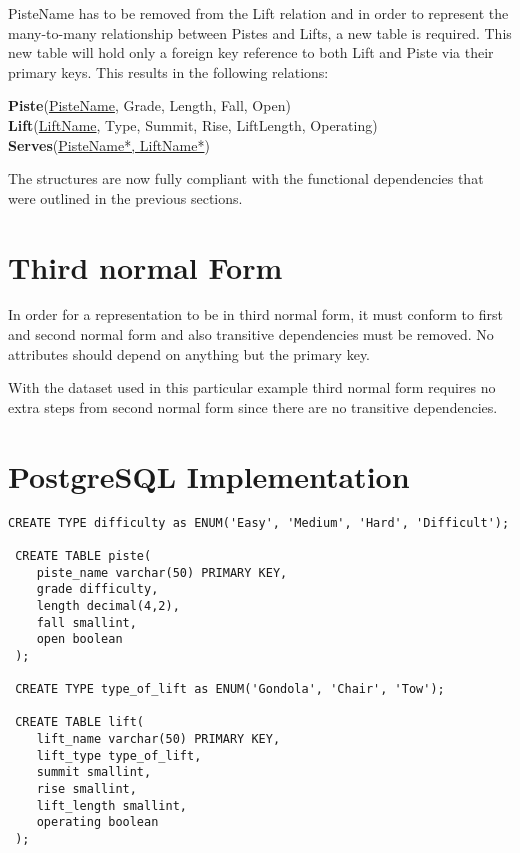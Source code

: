 \documentclass[titlepage ,12pt]{article}
\begin{document}
PisteName has to be removed from the Lift relation and in order to represent the many-to-many relationship between Pistes and Lifts, a new table is required. This new table will hold only a foreign key reference to both Lift and Piste via their primary keys. This results in the following relations: 

\textbf{Piste}(\underline{PisteName}, Grade, Length, Fall, Open) \\
\textbf{Lift}(\underline{LiftName}, Type, Summit, Rise, LiftLength, Operating) \\
\textbf{Serves}(\underline{PisteName*, LiftName*})

The structures are now fully compliant with the functional dependencies that were outlined in the previous sections.

\section{Third normal Form}
In order for a representation to be in third normal form, it must conform to first and second normal form and also transitive dependencies must be removed. No attributes should depend on anything but the primary key.

With the dataset used in this particular example third normal form requires no extra steps from second normal form since there are no transitive dependencies. 
\newpage  
\section{PostgreSQL Implementation}

\begin{lstlisting}[breaklines=true]
 CREATE TYPE difficulty as ENUM('Easy', 'Medium', 'Hard', 'Difficult');
 
 CREATE TABLE piste(
 	piste_name varchar(50) PRIMARY KEY,
 	grade difficulty,
 	length decimal(4,2),
 	fall smallint,
 	open boolean
 );
 
 CREATE TYPE type_of_lift as ENUM('Gondola', 'Chair', 'Tow');
 
 CREATE TABLE lift(
 	lift_name varchar(50) PRIMARY KEY,
 	lift_type type_of_lift,
 	summit smallint,
 	rise smallint,
 	lift_length smallint,
 	operating boolean
 );
 
\end{lstlisting}
\end{document}

